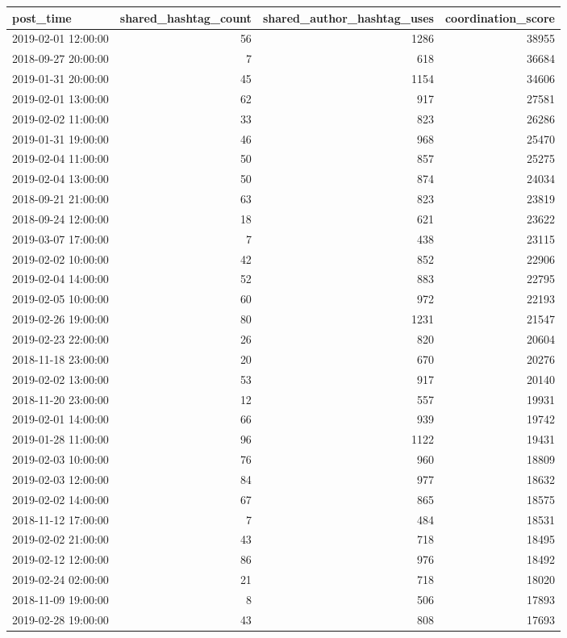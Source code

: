 \begin{tabular}{lrrr}
\toprule
post\_time & shared\_hashtag\_count & shared\_author\_hashtag\_uses & coordination\_score \\
\midrule
2019-02-01 12:00:00 & 56 & 1286 & 38955 \\
2018-09-27 20:00:00 & 7 & 618 & 36684 \\
2019-01-31 20:00:00 & 45 & 1154 & 34606 \\
2019-02-01 13:00:00 & 62 & 917 & 27581 \\
2019-02-02 11:00:00 & 33 & 823 & 26286 \\
2019-01-31 19:00:00 & 46 & 968 & 25470 \\
2019-02-04 11:00:00 & 50 & 857 & 25275 \\
2019-02-04 13:00:00 & 50 & 874 & 24034 \\
2018-09-21 21:00:00 & 63 & 823 & 23819 \\
2018-09-24 12:00:00 & 18 & 621 & 23622 \\
2019-03-07 17:00:00 & 7 & 438 & 23115 \\
2019-02-02 10:00:00 & 42 & 852 & 22906 \\
2019-02-04 14:00:00 & 52 & 883 & 22795 \\
2019-02-05 10:00:00 & 60 & 972 & 22193 \\
2019-02-26 19:00:00 & 80 & 1231 & 21547 \\
2019-02-23 22:00:00 & 26 & 820 & 20604 \\
2018-11-18 23:00:00 & 20 & 670 & 20276 \\
2019-02-02 13:00:00 & 53 & 917 & 20140 \\
2018-11-20 23:00:00 & 12 & 557 & 19931 \\
2019-02-01 14:00:00 & 66 & 939 & 19742 \\
2019-01-28 11:00:00 & 96 & 1122 & 19431 \\
2019-02-03 10:00:00 & 76 & 960 & 18809 \\
2019-02-03 12:00:00 & 84 & 977 & 18632 \\
2019-02-02 14:00:00 & 67 & 865 & 18575 \\
2018-11-12 17:00:00 & 7 & 484 & 18531 \\
2019-02-02 21:00:00 & 43 & 718 & 18495 \\
2019-02-12 12:00:00 & 86 & 976 & 18492 \\
2019-02-24 02:00:00 & 21 & 718 & 18020 \\
2018-11-09 19:00:00 & 8 & 506 & 17893 \\
2019-02-28 19:00:00 & 43 & 808 & 17693 \\

\end{tabular}
